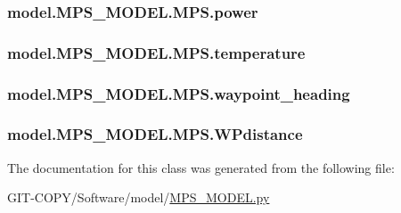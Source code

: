 \subsubsection[{power}]{\setlength{\rightskip}{0pt plus 5cm}model.\+M\+P\+S\+\_\+\+M\+O\+D\+E\+L.\+M\+P\+S.\+power}\label{classmodel_1_1MPS__MODEL_1_1MPS_a1c6a7ec24b1664643e627e4a5a58748f}
\hypertarget{classmodel_1_1MPS__MODEL_1_1MPS_af856ffc36b02be59cc50b46d49ad408c}{}
\subsubsection[{temperature}]{\setlength{\rightskip}{0pt plus 5cm}model.\+M\+P\+S\+\_\+\+M\+O\+D\+E\+L.\+M\+P\+S.\+temperature}\label{classmodel_1_1MPS__MODEL_1_1MPS_af856ffc36b02be59cc50b46d49ad408c}
\hypertarget{classmodel_1_1MPS__MODEL_1_1MPS_a96d9a3fcd3cfea8f85d3255742a00995}{}
\subsubsection[{waypoint\+\_\+heading}]{\setlength{\rightskip}{0pt plus 5cm}model.\+M\+P\+S\+\_\+\+M\+O\+D\+E\+L.\+M\+P\+S.\+waypoint\+\_\+heading}\label{classmodel_1_1MPS__MODEL_1_1MPS_a96d9a3fcd3cfea8f85d3255742a00995}
\hypertarget{classmodel_1_1MPS__MODEL_1_1MPS_a3e79c73cf4a5a655b367ccb1302c5fb6}{}
\subsubsection[{W\+Pdistance}]{\setlength{\rightskip}{0pt plus 5cm}model.\+M\+P\+S\+\_\+\+M\+O\+D\+E\+L.\+M\+P\+S.\+W\+Pdistance}\label{classmodel_1_1MPS__MODEL_1_1MPS_a3e79c73cf4a5a655b367ccb1302c5fb6}


The documentation for this class was generated from the following file\+:\begin{DoxyCompactItemize}
\item 
G\+I\+T-\/\+C\+O\+P\+Y/\+Software/model/\hyperlink{GIT-COPY_2Software_2model_2MPS__MODEL_8py}{M\+P\+S\+\_\+\+M\+O\+D\+E\+L.\+py}\end{DoxyCompactItemize}
